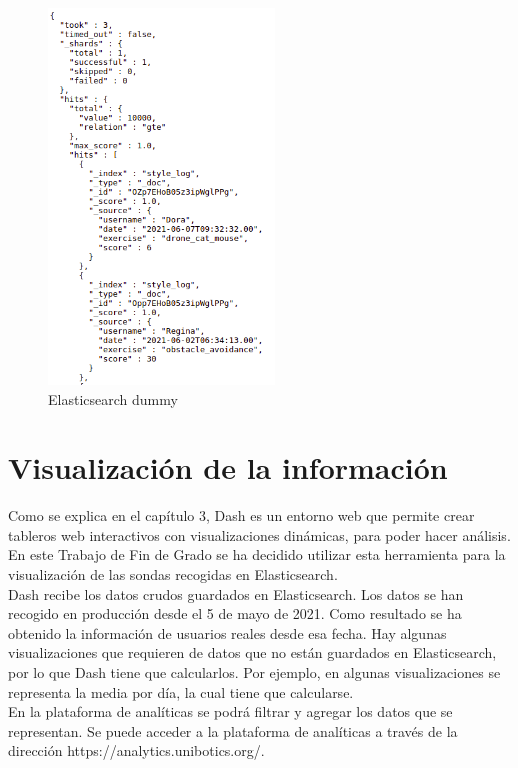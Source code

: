 \begin{figure}[H]
    \centering
    \includegraphics[width=6cm, keepaspectratio]{img/dummy.png}
    \caption{Elasticsearch dummy}
    \label{fig:dummy}
\end{figure}

\section{Visualización de la información}

Como se explica en el capítulo 3, Dash es un entorno web que permite crear tableros web interactivos con visualizaciones dinámicas, para poder hacer análisis. En este Trabajo de Fin de Grado se ha decidido utilizar esta herramienta para la visualización de las sondas recogidas en Elasticsearch.\\

Dash recibe los datos crudos guardados en Elasticsearch. Los datos se han recogido en producción desde el 5 de mayo de 2021. Como resultado se ha obtenido la información de usuarios reales desde esa fecha. Hay algunas visualizaciones que requieren de datos que no están guardados en Elasticsearch, por lo que Dash tiene que calcularlos. Por ejemplo, en algunas visualizaciones se representa la media por día, la cual tiene que calcularse.\\

En la plataforma de analíticas se podrá filtrar y agregar los datos que se representan. Se puede acceder a la plataforma de analíticas a través de la dirección https://analytics.unibotics.org/.\\

